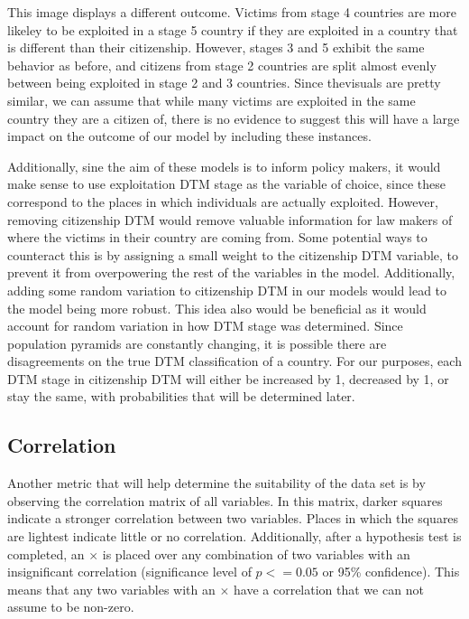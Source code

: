 \documentclass{article} %
\begin{document}
This image displays a different outcome. Victims from stage 4 countries are more likeley to be exploited in a stage 5 country if they are exploited in a country that is different than their citizenship. However, stages 3 and 5 exhibit the same behavior as before, and citizens from stage 2 countries are split almost evenly between being exploited in stage 2 and 3 countries. Since thevisuals are pretty similar, we can assume that while many victims are exploited in the same country they are a citizen of, there is no evidence to suggest this will have a large impact on the outcome of our model by including these instances. 

Additionally, sine the aim of these models is to inform policy makers, it would make sense to use exploitation DTM stage as the variable of choice, since these correspond to the places in which individuals are actually exploited. However, removing citizenship DTM would remove valuable information for law makers of where the victims in their country are coming from. 
Some potential ways to counteract this is by assigning a small weight to the citizenship DTM variable, to prevent it from overpowering the rest of the variables in the model. Additionally, adding some random variation to citizenship DTM in our models would lead to the model being more robust. This idea also would be beneficial as it would account for random variation in how DTM stage was determined. Since population pyramids are constantly changing, it is possible there are disagreements on the true DTM classification of a country. For our purposes, each DTM stage in citizenship DTM will either be increased by 1, decreased by 1, or stay the same, with probabilities that will be determined later.

\subsection{Correlation}

Another metric that will help determine the suitability of the data set is by observing the correlation matrix of all variables. In this matrix, darker squares indicate a stronger correlation between two variables. Places in which the squares are lightest indicate little or no correlation. Additionally, after a hypothesis test is completed, an $\times$ is placed over any combination of two variables with an insignificant correlation (significance level of $p <= 0.05$ or 95\% confidence). This means that any two variables with an $\times$ have a correlation that we can not assume to be non-zero.
\end{document}
